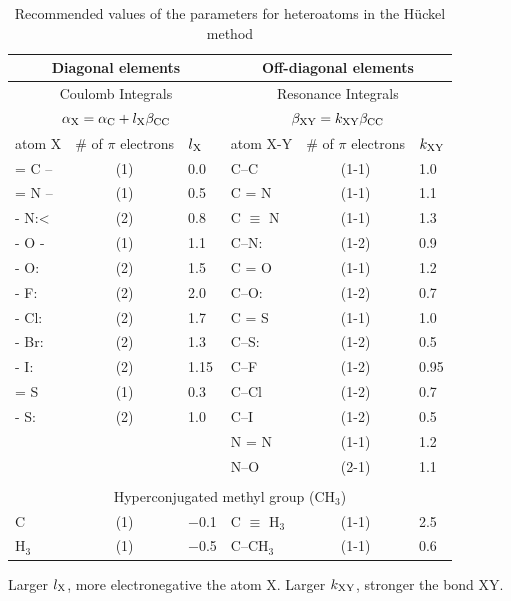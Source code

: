 \documentclass[../Main/chem532-notes.tex]{subfiles}
\begin{document}
\begin{table}[h!]
   \centering
   \caption{Recommended values of the parameters for heteroatoms in the H\"{u}ckel method} %
   \begin{tabular}{@{} lcllcl @{}} %
      \toprule
	\multicolumn{3}{c}{Diagonal elements} & \multicolumn{3}{c}{Off-diagonal elements} \\
	\midrule
	\multicolumn{3}{c}{Coulomb Integrals} & \multicolumn{3}{c}{Resonance Integrals}\\
	\multicolumn{3}{c}{$\alpha_{\rm X} = \alpha_{\rm C} + l_{\rm X} \beta_{\rm CC}$}
	& \multicolumn{3}{c}{$\beta_{\rm XY} = k_{\rm XY} \beta_{\rm CC}$}\\
	\midrule
	atom X & \# of $\pi$ electrons & $l_{\rm X}$ & atom X-Y & \# of $\pi$ electrons & $k_{\rm XY}$ \\
	\midrule
	= C -- & (1) & 0.0 & C--C & (1-1) & 1.0 \\
	= N -- & (1) & 0.5 & C = N & (1-1) & 1.1 \\
	- N:< & (2) & 0.8 & C $\equiv$ N & (1-1) & 1.3 \\
	- O - & (1) & 1.1 & C--N: & (1-2) & 0.9 \\
	- O: & (2) & 1.5 & C = O & (1-1) & 1.2 \\
	- F: & (2) & 2.0 & C--O: & (1-2) & 0.7 \\
	- Cl: & (2) & 1.7 & C = S & (1-1) & 1.0 \\
	- Br: & (2) & 1.3 & C--S: & (1-2) & 0.5 \\
	- I: & (2) & 1.15 & C--F & (1-2) & 0.95 \\
	= S & (1) & 0.3 & C--Cl & (1-2) & 0.7 \\
	- S: & (2) & 1.0 & C--I & (1-2) & 0.5 \\
	& & & N = N & (1-1) & 1.2\\
	& & & N--O & (2-1) & 1.1 \\
	\\
	\multicolumn{6}{c}{Hyperconjugated methyl group (CH$_3$)}  \\
	C & (1) & $-$0.1 &  C $\equiv$ H$_3$ & (1-1) & 2.5   \\
	H$_3$ & (1) & $-$0.5 & C--CH$_3$ & (1-1) & 0.6\\
	\bottomrule
   \end{tabular}
   
   Larger $l_{\rm X}$, more electronegative the atom X. Larger $k_{\rm XY}$, stronger the bond XY.
   \label{tab:booktabs}
\end{table}
\end{document}
